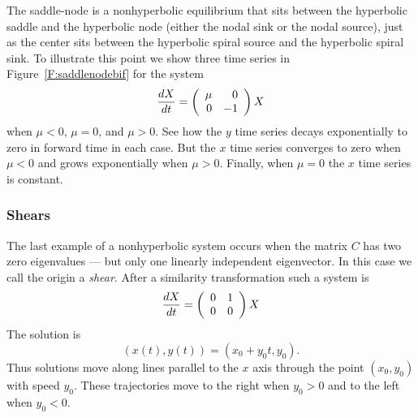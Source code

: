 \documentclass{ximera}
\begin{document}
\begin{figure*}[htb]
     \centerline{%
     }
     \caption{(Left) Phase portrait of \protect\eqref{e:10ev}.
	(Right) Time series of a solution.}
     \label{F:10ev}
\end{figure*}

The saddle-node is a
nonhyperbolic equilibrium
that sits between
the hyperbolic saddle and the hyperbolic node (either the nodal
sink or the nodal source), just as the center sits
between the hyperbolic spiral source and the hyperbolic spiral sink.  To
illustrate this point we show three time series in
Figure~\ref{F:saddlenodebif} for the system
\begin{equation}  \label{e:saddlenodebif}
\frac{dX}{dt}  =  \left(\begin{array}{rr} \mu & 0\\ 0 &-1\end{array}\right)X
\end{equation}
when $\mu<0$, $\mu=0$, and $\mu>0$.  See how the $y$ time series
decays exponentially to zero in forward time in each case.  But
the $x$ time series converges to zero when $\mu<0$ and grows
exponentially when $\mu>0$.  Finally, when $\mu=0$ the $x$ time
series is constant.

\begin{figure*}[htb]
     \centerline{%
     }
     \caption{Time series for solutions of \protect\eqref{e:saddlenodebif}
	when $\mu=-0.2,0,0.2$.}
     \label{F:saddlenodebif}
\end{figure*}


\subsubsection*{Shears}

The last example of a nonhyperbolic system occurs when the matrix $C$
has two zero eigenvalues --- but only one linearly independent
eigenvector.  In this case we call the origin a {\em shear\/}.  After a
similarity transformation such a system is
\begin{equation}  \label{e:00}
\frac{dX}{dt} = \left(\begin{array}{rr} 0 & 1\\ 0 &0\end{array}\right) X
\end{equation}
The solution is
\[
(x(t),y(t)) = (x_0+y_0t,y_0).
\]
Thus solutions move along lines parallel to the $x$ axis through
the point $(x_0,y_0)$ with speed $y_0$.  These trajectories move
to the right when $y_0>0$ and to the left when $y_0<0$.



\end{document}
